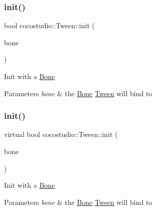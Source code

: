 \subsubsection{\texorpdfstring{init()}{init()}\hspace{0.1cm}{\footnotesize\ttfamily [1/2]}}
{\footnotesize\ttfamily bool cocostudio\+::\+Tween\+::init (\begin{DoxyParamCaption}\item[{\hyperlink{classcocostudio_1_1Bone}{Bone} $\ast$}]{bone }\end{DoxyParamCaption})\hspace{0.3cm}{\ttfamily [virtual]}}

Init with a \hyperlink{classcocostudio_1_1Bone}{Bone} 
\begin{DoxyParams}{Parameters}
{\em bone} & the \hyperlink{classcocostudio_1_1Bone}{Bone} \hyperlink{classcocostudio_1_1Tween}{Tween} will bind to \\
\hline
\end{DoxyParams}
\mbox{\label{classcocostudio_1_1Tween_a96ae9f0e84c93c8f65506347e7ad11b3}} 
\subsubsection{\texorpdfstring{init()}{init()}\hspace{0.1cm}{\footnotesize\ttfamily [2/2]}}
{\footnotesize\ttfamily virtual bool cocostudio\+::\+Tween\+::init (\begin{DoxyParamCaption}\item[{\hyperlink{classcocostudio_1_1Bone}{Bone} $\ast$}]{bone }\end{DoxyParamCaption})\hspace{0.3cm}{\ttfamily [virtual]}}

Init with a \hyperlink{classcocostudio_1_1Bone}{Bone} 
\begin{DoxyParams}{Parameters}
{\em bone} & the \hyperlink{classcocostudio_1_1Bone}{Bone} \hyperlink{classcocostudio_1_1Tween}{Tween} will bind to \\
\hline
\end{DoxyParams}
\mbox{\label{classcocostudio_1_1Tween_a7d10c3c326a1cda2d53c60f1cf4a7e41}} 
